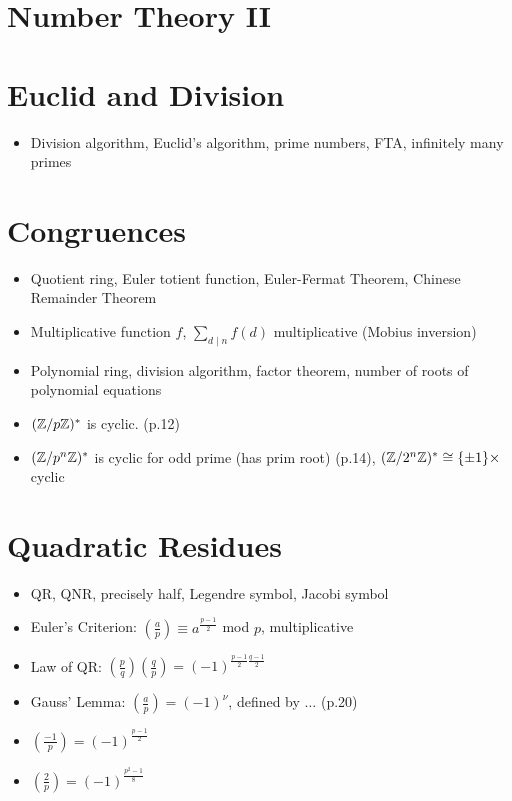 


\section*{Number Theory \hfill II}

\section{Euclid and Division}
\begin{itemize}
\item Division algorithm, Euclid's algorithm, prime numbers, FTA, infinitely many primes
\end{itemize}

\section{Congruences}
\begin{itemize}
\item Quotient ring, Euler totient function, Euler-Fermat Theorem, Chinese Remainder Theorem
\item Multiplicative function $f$, $\sum_{d \mid n} f(d)$ multiplicative (Mobius inversion)
\item Polynomial ring, division algorithm, factor theorem, number of roots of polynomial equations
\item $(\mathbb{Z} / p\mathbb{Z})^*$ is cyclic. (p.12)
\item $(\mathbb{Z} / p^n\mathbb{Z})^*$ is cyclic for odd prime (has prim root) (p.14), $(\mathbb{Z} / 2^n\mathbb{Z})^* \cong \{\pm 1\} \times $ cyclic 
\end{itemize}

\section{Quadratic Residues}
\begin{itemize}
    \item QR, QNR, precisely half, Legendre symbol, Jacobi symbol
    \item Euler's Criterion: $\left(\frac{a}{p}\right) \equiv a^\frac{p-1}{2}$ mod $p$, multiplicative
    \item Law of QR: $\left(\frac{p}{q}\right)\left(\frac{q}{p}\right)   = (-1)^{\frac{p-1}{2}\frac{q-1}{2}}$
    \item Gauss' Lemma: $\left(\frac{a}{p}\right) = (-1)^\nu$, defined by $\dots$ (p.20) 
    \item $\left(\frac{-1}{p}\right) = (-1)^\frac{p-1}{2}$ 
    \item $\left(\frac{2}{p}\right) = (-1)^\frac{p^2-1}{8}$ 
\end{itemize}


